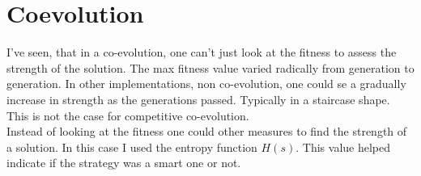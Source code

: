 \section{Coevolution}

I've seen, that in a co-evolution, one can't just look at the fitness to assess the strength of
the solution. The max fitness value varied radically from generation to generation. In other 
implementations, non co-evolution, one could se a gradually increase in strength as the
generations passed. Typically in a staircase shape. This is not the case for competitive 
co-evolution. \\

Instead of looking at the fitness one could other measures to find the strength of a solution.
In this case I used the entropy function $H(s)$. This value helped indicate if the strategy was
a smart one or not. \\

